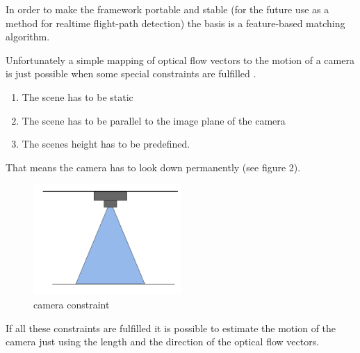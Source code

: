\documentclass[11pt]{article}
\begin{document}
	In order to make the framework portable and stable (for the future use as a method for realtime flight-path detection) the basis is a feature-based matching algorithm.

	Unfortunately a simple mapping of optical flow vectors to the motion of a camera is just possible when some special constraints are fulfilled \cite{BewegungsanalyseMuenchen}.
	
	\begin{enumerate}
	  \item The scene has to be static
	  \item The scene has to be parallel to the image plane of the camera
	  \item The scenes height has to be predefined.
	\end{enumerate}
	
	That means the camera has to look down permanently (see figure 2).

	\begin{figure}[H]
		\centering
		\includegraphics[width=0.5\textwidth]{images/look_down.png}
		\caption{camera constraint}
	\end{figure}

	
	If all these constraints are fulfilled it is possible to estimate the motion of the camera just using the length and the direction of the optical flow vectors.
\end{document}
